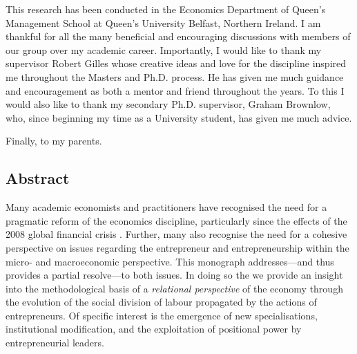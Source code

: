 \documentclass[11pt,fleqn]{book}
\begin{document}
This research has been conducted in the Economics Department of Queen's Management School at Queen's University Belfast, Northern Ireland. I am thankful for all the many beneficial and encouraging discussions with members of our group over my academic career. Importantly, I would like to thank my supervisor Robert Gilles whose creative ideas and love for the discipline inspired me throughout the Masters and Ph.D. process. He has given me much guidance and encouragement as both a mentor and friend throughout the years. To this I would also like to thank my secondary Ph.D. supervisor, Graham Brownlow, who, since beginning my time as a University student, has given me much advice.

Finally, to my parents. 



\newpage

\setcounter{page}{1} 

\begin{singlespace}
\setcounter{tocdepth}{2}
\tableofcontents

\listoffigures

\chapter*{Abstract}


Many academic economists and practitioners have recognised the need for a pragmatic reform of the economics discipline, particularly since the effects of the 2008 global financial crisis \citep{Hodgson2009}. Further, many also recognise the need for a cohesive perspective on issues regarding the entrepreneur and entrepreneurship within the micro- and macroeconomic perspective. This monograph addresses---and thus provides a partial resolve---to both issues. In doing so the we provide an insight into the methodological basis of a \emph{relational perspective} of the economy through the evolution of the social division of labour propagated by the actions of entrepreneurs. Of specific interest is the emergence of new specialisations, institutional modification, and the exploitation of positional power by entrepreneurial leaders.

\end{singlespace}

\newpage










\singlespace




\end{document}
